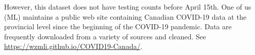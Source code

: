 \documentclass[12pt]{article}\usepackage[]{graphicx}\usepackage[]{color}
\begin{document}
However, this dataset does not have testing counts before April 15th. 
One of us (ML) maintains a public web site containing Canadian COVID-19 data at the provincial level since the beginning of the COVID-19 pandemic.   
Data are frequently downloaded from a variety of sources and cleaned.  See
\url{https://wzmli.github.io/COVID19-Canada/}.


% 
% 
\end{document}
